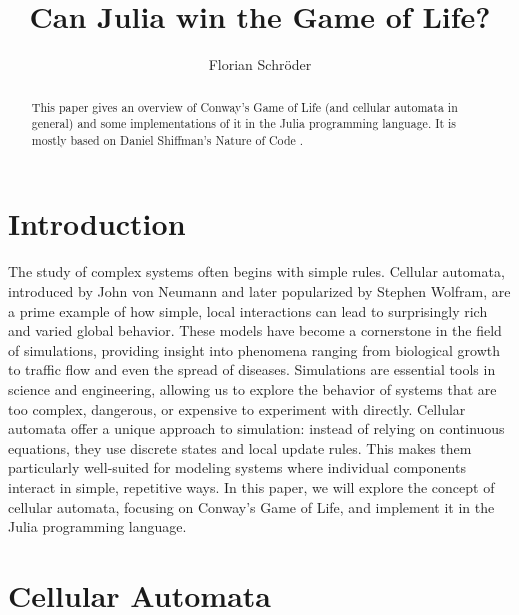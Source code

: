 \documentclass[a4paper,12pt]{llncs}
\numberwithin{equation}{section}
\begin{document}

%
\author{Florian Schröder}
%
\title{Can Julia win the Game of Life?}
%
%
\maketitle              %
\thispagestyle{empty}
%
%
\begin{abstract}
  This paper gives an overview of Conway's Game of Life (and cellular automata in general) and some implementations of it in the Julia programming language.
  It is mostly based on Daniel Shiffman's Nature of Code \cite{NOC}.
\end{abstract}


\section{Introduction}
The study of complex systems often begins with simple rules.
Cellular automata, introduced by John von Neumann and later popularized by Stephen Wolfram, are a prime example of how simple, local interactions can lead to surprisingly rich and varied global behavior.
These models have become a cornerstone in the field of simulations, providing insight into phenomena ranging from biological growth to traffic flow and even the spread of diseases.
Simulations are essential tools in science and engineering, allowing us to explore the behavior of systems that are too complex, dangerous, or expensive to experiment with directly.
Cellular automata offer a unique approach to simulation: instead of relying on continuous equations, they use discrete states and local update rules.
This makes them particularly well-suited for modeling systems where individual components interact in simple, repetitive ways.
In this paper, we will explore the concept of cellular automata, focusing on Conway's Game of Life, and implement it in the Julia programming language.

\section{Cellular Automata}
\end{document}
